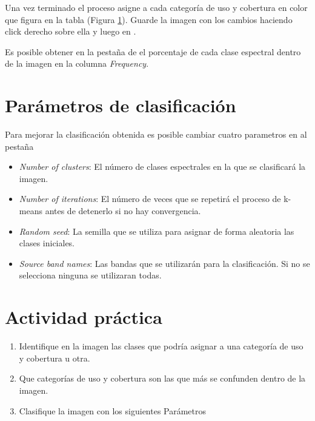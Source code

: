 Una vez terminado el proceso asigne a cada categoría de uso y cobertura en color que figura en la tabla (Figura \ref{fig:resclass}). Guarde la imagen con los cambios haciendo click derecho sobre ella y luego en .

\begin{figure}[h!]
    \centering
    \hspace{1cm}
    \caption{}
    \label{fig:resclass}
\end{figure}

Es posible obtener en la pestaña de  el porcentaje de cada clase espectral dentro de la imagen en la columna \emph{Frequency}.

\section{Parámetros de clasificación}

Para mejorar la clasificación obtenida es posible cambiar cuatro parametros en al pestaña 

\begin{itemize}
  \item \emph{Number of clusters}: El número de clases espectrales en la que se clasificará la imagen.
  \item \emph{Number of iterations}: El número de veces que se repetirá el proceso de k-means antes de detenerlo si no hay convergencia.
  \item \emph{Random seed}: La semilla que se utiliza para asignar de forma aleatoria las clases iniciales.
  \item \emph{Source band names}: Las bandas que se utilizarán para la clasificación. Si no se selecciona ninguna se utilizaran todas.
\end{itemize}

\section{Actividad práctica}

\begin{enumerate}
  \item Identifique en la imagen las clases que podría asignar a una categoría de uso y cobertura u otra.
  \item Que categorías de uso y cobertura son las que más se confunden dentro de la imagen.
  \item Clasifique la imagen con los siguientes Parámetros
\end{enumerate}

